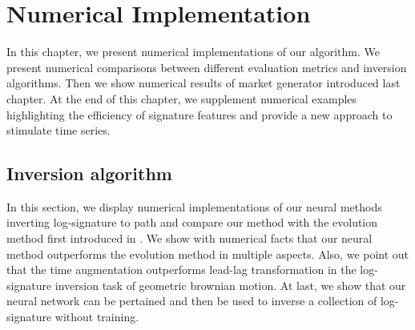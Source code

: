 \documentclass[12pt]{report}
\theoremstyle{definition}
\theoremstyle{remark}
\begin{document}
\chapter{Numerical Implementation}
In this chapter, we present numerical implementations of our algorithm. We present numerical comparisons between different evaluation metrics and inversion algorithms. Then we show numerical results of market generator introduced last chapter. At the end of this chapter, we supplement numerical examples highlighting the efficiency of signature features and provide a new approach to stimulate time series. 


\section{Inversion algorithm}
In this section, we display numerical implementations of our neural methods inverting log-signature to path and compare our method with the evolution method first introduced in \cite{buehler2020data}. We show with numerical facts that our neural method outperforms the evolution method in multiple aspects. Also, we point out that the time augmentation outperforms lead-lag transformation in the log-signature inversion task of geometric brownian motion. At last, we show that our neural network can be pertained and then be used to inverse a collection of log-signature without training.
\end{document}
